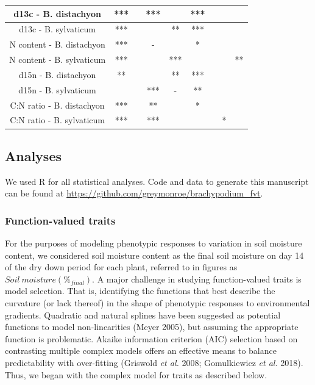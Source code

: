 \documentclass[jou,floatsintext]{apa6}
\begin{document}
\begin{table}[tbp]
\begin{center}
\begin{threeparttable}
{\begin{tabular}{ccccccccc}
d13c - B. distachyon & *** &  & *** &  & *** &  &  & \\ \midrule
d13c - B. sylvaticum & *** &  &  & ** & *** &  &  & \\ \midrule
N content - B. distachyon & *** &  & - &  & * &  &  & \\ \midrule
N content - B. sylvaticum & *** &  &  & *** &  &  &  & **\\ \midrule
d15n - B. distachyon & ** &  &  & ** & *** &  &  & \\ \midrule
d15n - B. sylvaticum &  &  & *** & - & ** &  &  & \\ \midrule
C:N ratio - B. distachyon & *** &  & ** &  & * &  &  & \\ \midrule
C:N ratio - B. sylvaticum & *** &  & *** &  &  &  & * & \\ \midrule
\bottomrule
\end{tabular}
}
\end{threeparttable}
\end{center}
\end{table}

\hypertarget{analyses}{%
\subsection{Analyses}\label{analyses}}

We used R for all statistical analyses. Code and data to generate this manuscript can be found at \url{https://github.com/greymonroe/brachypodium_fvt}.

\hypertarget{function-valued-traits}{%
\subsubsection{Function-valued traits}\label{function-valued-traits}}

For the purposes of modeling phenotypic responses to variation in soil moisture content, we considered soil moisture content as the final soil moisture on day 14 of the dry down period for each plant, referred to in figures as \(Soil\ moisture (\%_{final})\). A major challenge in studying function-valued traits is model selection. That is, identifying the functions that best describe the curvature (or lack thereof) in the shape of phenotypic responses to environmental gradients. Quadratic and natural splines have been suggested as potential functions to model non-linearities (Meyer 2005), but assuming the appropriate function is problematic. Akaike information criterion (AIC) selection based on contrasting multiple complex models offers an effective means to balance predictability with over-fitting (Griswold \emph{et al.} 2008; Gomulkiewicz \emph{et al.} 2018). Thus, we began with the complex model for traits as described below.
\end{document}
